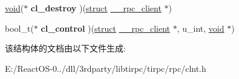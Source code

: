 \begin{DoxyCompactItemize}
\mbox{\label{struct____rpc__client_1_1clnt__ops_a4d43ae3825a5a502612dd97e354efb74}} 
\hyperlink{interfacevoid}{void}($\ast$ {\bfseries cl\+\_\+destroy} )(\hyperlink{interfacestruct}{struct} \hyperlink{struct____rpc__client}{\+\_\+\+\_\+rpc\+\_\+client} $\ast$)
\item 
\mbox{\label{struct____rpc__client_1_1clnt__ops_a5721725ce3fca5505f539b48f091e6e3}} 
bool\+\_\+t($\ast$ {\bfseries cl\+\_\+control} )(\hyperlink{interfacestruct}{struct} \hyperlink{struct____rpc__client}{\+\_\+\+\_\+rpc\+\_\+client} $\ast$, u\+\_\+int, \hyperlink{interfacevoid}{void} $\ast$)
\end{DoxyCompactItemize}


该结构体的文档由以下文件生成\+:\begin{DoxyCompactItemize}
\item 
E\+:/\+React\+O\+S-\/0../dll/3rdparty/libtirpc/tirpc/rpc/clnt.\+h\end{DoxyCompactItemize}

